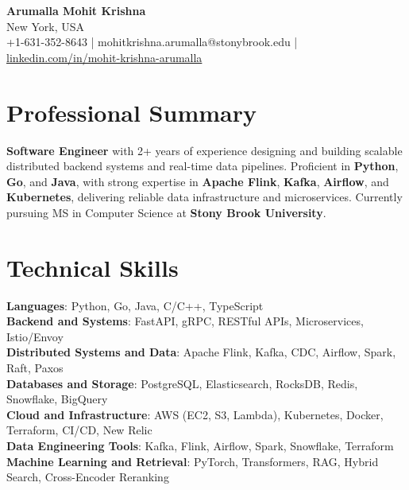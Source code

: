 \documentclass[letterpaper,11pt]{article}
\begin{document}
\begin{center}
  {\Large \textbf{Arumalla Mohit Krishna}} \\
  New York, USA \\
  +1-631-352-8643 \enspace | \enspace mohitkrishna.arumalla@stonybrook.edu \enspace | \enspace \href{https://www.linkedin.com/in/mohit-krishna-arumalla}{linkedin.com/in/mohit-krishna-arumalla}
\end{center}

\section{Professional Summary}
  \begin{itemize}[leftmargin=0.15in, label={}]
    \small{\item{
     \textbf{Software Engineer} with 2+ years of experience designing and building scalable distributed backend systems and real-time data pipelines. Proficient in \textbf{Python}, \textbf{Go}, and \textbf{Java}, with strong expertise in \textbf{Apache Flink}, \textbf{Kafka}, \textbf{Airflow}, and \textbf{Kubernetes}, delivering reliable data infrastructure and microservices. Currently pursuing MS in Computer Science at \textbf{Stony Brook University}.
    }}
  \end{itemize}
\vspace{-16pt}

\section{Technical Skills}
 \begin{itemize}[leftmargin=0.15in, label={}]
    \small{\item{
     \textbf{Languages}: Python, Go, Java, C/C++, TypeScript \\
     \textbf{Backend and Systems}: FastAPI, gRPC, RESTful APIs, Microservices, Istio/Envoy \\
     \textbf{Distributed Systems and Data}: Apache Flink, Kafka, CDC, Airflow, Spark, Raft, Paxos \\
     \textbf{Databases and Storage}: PostgreSQL, Elasticsearch, RocksDB, Redis, Snowflake, BigQuery \\
     \textbf{Cloud and Infrastructure}: AWS (EC2, S3, Lambda), Kubernetes, Docker, Terraform, CI/CD, New Relic \\
     \textbf{Data Engineering Tools}: Kafka, Flink, Airflow, Spark, Snowflake, Terraform \\
     \textbf{Machine Learning and Retrieval}: PyTorch, Transformers, RAG, Hybrid Search, Cross-Encoder Reranking
    }}
 \end{itemize}
\vspace{-16pt}
\end{document}
